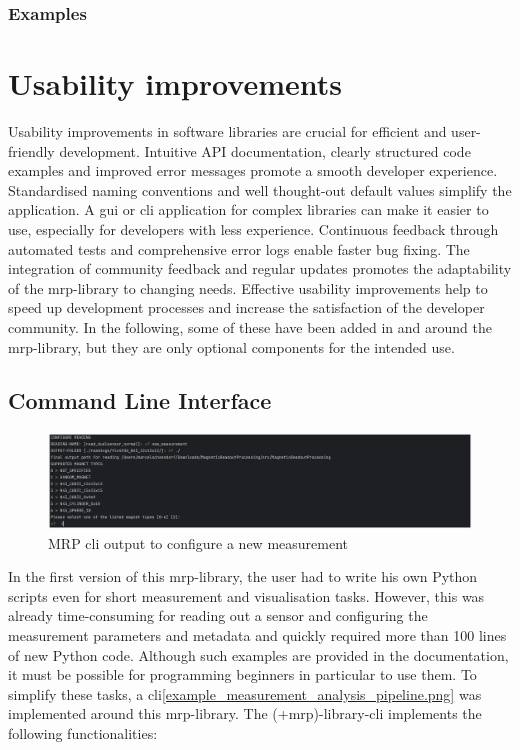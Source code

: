 \hypertarget{examples}{%
\subsection{Examples}\label{examples}}

\hypertarget{usability-improvements}{%
\chapter{Usability improvements}\label{usability-improvements}}

Usability improvements in software libraries are crucial for efficient
and user-friendly development. Intuitive API documentation, clearly
structured code examples and improved error messages promote a smooth
developer experience. Standardised naming conventions and well
thought-out default values simplify the application. A \gls{gui} or
\gls{cli} application for complex libraries can make it easier to use,
especially for developers with less experience. Continuous feedback
through automated tests and comprehensive error logs enable faster bug
fixing. The integration of community feedback and regular updates
promotes the adaptability of the \gls{mrp}-library to changing needs.
Effective usability improvements help to speed up development processes
and increase the satisfaction of the developer community. In the
following, some of these have been added in and around the
\gls{mrp}-library, but they are only optional components for the
intended use.

\hypertarget{command-line-interface}{%
\section{Command Line Interface}\label{command-line-interface}}

\begin{figure}
\centering
\includegraphics{./generated_images/border_MRP_(+cli)_output_to_configure_a_new_measurement.png}
\caption{MRP \gls{cli} output to configure a new measurement
\label{MRP_(+cli)_output_to_configure_a_new_measurement.png}}
\end{figure}

In the first version of this \gls{mrp}-library, the user had to write
his own Python scripts even for short measurement and visualisation
tasks. However, this was already time-consuming for reading out a sensor
and configuring the measurement parameters and metadata and quickly
required more than 100 lines of new Python code. Although such examples
are provided in the documentation, it must be possible for programming
beginners in particular to use them. To simplify these tasks, a
\gls{cli}\ref{example_measurement_analysis_pipeline.png} was implemented
around this \gls{mrp}-library. The (+mrp)-library-\gls{cli} implements
the following functionalities:

